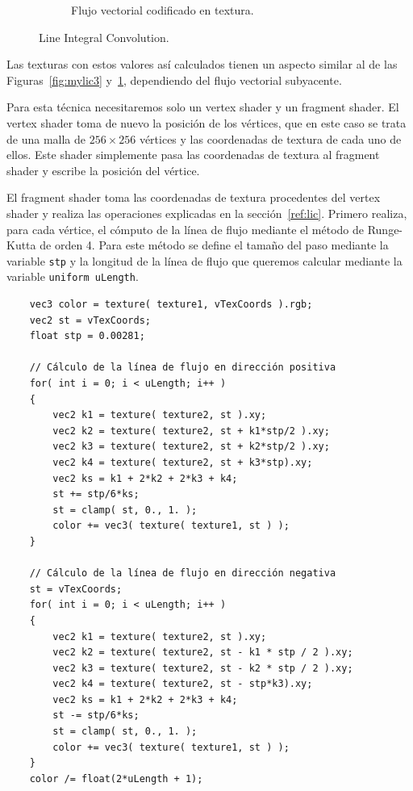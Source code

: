 \begin{figure}
\begin{subfigure}{0.45\textwidth}
		\caption{Flujo vectorial codificado en textura.}
		\label{fig:mylic4}
	\end{subfigure}
	\caption{Line Integral Convolution.}
	\label{fig:mylic}
\end{figure}

Las texturas con estos valores así calculados tienen un aspecto similar al de las
Figuras~\ref{fig:mylic3} y~\ref{fig:mylic4}, dependiendo del flujo vectorial
subyacente.

Para esta técnica necesitaremos solo un vertex shader y un fragment shader. El
vertex shader toma de nuevo la posición de los vértices, que en este caso se
trata de una malla de $256\times 256$ vértices y las coordenadas de textura de
cada uno de ellos. Este shader simplemente pasa las coordenadas de textura al
fragment shader y escribe la posición del vértice. 

El fragment shader toma las coordenadas de textura procedentes del vertex shader
y realiza las operaciones explicadas en la sección~\ref{ref:lic}. Primero
realiza, para cada vértice, el cómputo de la línea de flujo mediante el método
de Runge-Kutta de orden 4. Para este método se define el tamaño del paso
mediante la variable \verb|stp| y la longitud de la línea de flujo que queremos
calcular mediante la variable \verb|uniform uLength|.

\begin{verbatim}
    vec3 color = texture( texture1, vTexCoords ).rgb;
    vec2 st = vTexCoords;
    float stp = 0.00281;

    // Cálculo de la línea de flujo en dirección positiva
    for( int i = 0; i < uLength; i++ )
    {
        vec2 k1 = texture( texture2, st ).xy;
        vec2 k2 = texture( texture2, st + k1*stp/2 ).xy;
        vec2 k3 = texture( texture2, st + k2*stp/2 ).xy;
        vec2 k4 = texture( texture2, st + k3*stp).xy;
        vec2 ks = k1 + 2*k2 + 2*k3 + k4;
        st += stp/6*ks;
        st = clamp( st, 0., 1. );
        color += vec3( texture( texture1, st ) );
    }

    // Cálculo de la línea de flujo en dirección negativa
    st = vTexCoords;
    for( int i = 0; i < uLength; i++ )
    {
        vec2 k1 = texture( texture2, st ).xy;
        vec2 k2 = texture( texture2, st - k1 * stp / 2 ).xy;
        vec2 k3 = texture( texture2, st - k2 * stp / 2 ).xy;
        vec2 k4 = texture( texture2, st - stp*k3).xy;
        vec2 ks = k1 + 2*k2 + 2*k3 + k4;
        st -= stp/6*ks;
        st = clamp( st, 0., 1. );
        color += vec3( texture( texture1, st ) );
    }
    color /= float(2*uLength + 1); 
\end{verbatim}


